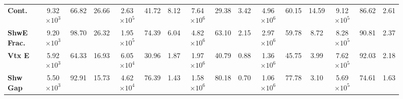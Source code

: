 \begin{sidewaysfigure}[!hb]
\begin{scriptsize}
\begin{tabular}{|l|ccc|ccc|ccc|ccc|ccc|}
\textbf{Cont.}  & 9.32$\times 10^3$           & 66.82                                                               & 26.66                                      & 2.63$\times 10^5$             & 41.72                                                                 & 8.12                                         & 7.64$\times 10^6$              & 29.38                                                                  & 3.42                                          & 4.96$\times 10^6$          & 60.15                                                              & 14.59                                     & 9.12$\times 10^5$             & 86.62                                                                 & 2.61                                         \\
\textbf{ShwE Frac.}  & 9.20$\times 10^3$           & 98.70                                                               & 26.32                                      & 1.95$\times 10^5$             & 74.39                                                                 & 6.04                                         & 4.82$\times 10^6$              & 63.10                                                                  & 2.15                                          & 2.97$\times 10^6$          & 59.78                                                              & 8.72                                      & 8.28$\times 10^5$             & 90.81                                                                 & 2.37                                         \\
\textbf{Vtx E}         & 5.92$\times 10^3$           & 64.33                                                               & 16.93                                      & 6.05$\times 10^4$             & 30.96                                                                 & 1.87                                         & 1.97$\times 10^6$ & 40.79                                                                  & 0.88                                          & 1.36$\times 10^6$          & 45.75                                                              & 3.99                                      & 7.62$\times 10^5$             & 92.03                                                                 & 2.18                                         \\
\textbf{Shw Gap}          & 5.50$\times 10^3$           & 92.91                                                               & 15.73                                      & 4.62$\times 10^4$             & 76.39                                                                 & 1.43                                         & 1.58$\times 10^6$ & 80.18                                                                  & 0.70                                          & 1.06$\times 10^6$          & 77.78                                                              & 3.10                                      & 5.69$\times 10^5$             & 74.61                                                                 & 1.63                                         \\

\end{tabular}
\end{scriptsize}
\end{sidewaysfigure}
